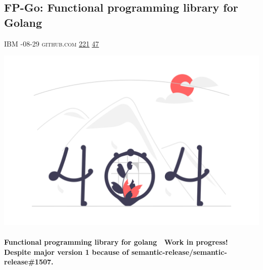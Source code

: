 \documentclass[10pt,a4paper]{article}
\begin{document}
\begin{multicols*}{2}
\begin{minipage}{\linewidth}
\subsection{FP-Go: Functional programming library for Golang}
\textsc{\footnotesize
{\scriptsize\faUser}\space 
IBM 
{\scriptsize\faCalendar}-08-29 
{\scriptsize\faGithub}\space 
github.com 
{\scriptsize\faThumbsOUp}\space 
\href{http://news.ycombinator.com/item?id=37171149\&utm\_term=comment}{221} 
{\scriptsize\faComments}\space 
\href{http://news.ycombinator.com/item?id=37171149\&utm\_term=comment}{47} 
}
\par\medskip\noindent
\href{https://github.com/IBM/fp-go?utm\_source=hackernewsletter\&utm\_medium=email\&utm\_term=code}{
    \includegraphics[width=0.99\linewidth]{notfound.png}
}
\end{minipage}
\paragraph{}
\textbf{Functional programming library for golang
🚧 Work in progress! 🚧 Despite major version 1 because of semantic-release/semantic-release\#1507.}

\end{multicols*}
\end{document}
